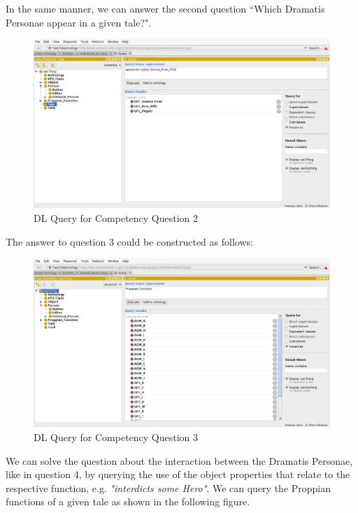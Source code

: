 \documentclass[10pt,a4paper]{article}
\begin{document}
In the same manner, we can answer the second question ``Which Dramatis Personae appear in a given tale?". 
\begin{figure} [H]

\centering
 	\includegraphics[scale=0.2]{Screen7.png}
 	\caption{DL Query for Competency Question 2}
\end{figure}
The answer to question 3 could be constructed as follows: 
\begin{figure} [H]
\centering
 	\includegraphics[scale=0.2]{Screen8.png}
 	\caption{DL Query for Competency Question 3}
\end{figure}

We can solve the question about the interaction between the Dramatis Personae, like in question 4, by querying the use of the object properties that relate to the respective function, e.g. \textit{"interdicts some Hero"}. We can query the Proppian functions of a given tale as shown in the following figure. 
\end{document}
